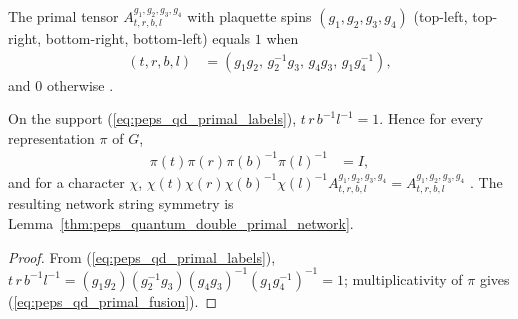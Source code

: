 





\begin{definition}%
    \label{def:peps_quantum_double_primal}
    \leanok
    The primal tensor $A^{g_1,g_2,g_3,g_4}_{t,r,b,l}$ with plaquette spins $(g_1,g_2,g_3,g_4)$ (top-left, top-right, bottom-right, bottom-left) equals $1$ when
    \begin{align}
        (t,r,b,l) & =(g_1g_2,\,g_2^{-1}g_3,\,g_4g_3,\,g_1g_4^{-1}),
        \label{eq:peps_qd_primal_labels}
    \end{align}
    and $0$ otherwise \cite[Appendix~A, ``The Toric Code and quantum double models'']{Cirac2021Matrix}.
\end{definition}

\begin{lemma}%
    \label{thm:peps_quantum_double_primal_fusion}
    \leanok
    On the support (\ref{eq:peps_qd_primal_labels}), $t\,r\,b^{-1}l^{-1}=1$. Hence for every representation $\pi$ of $G$,
    \begin{align}
        \pi(t)\pi(r)\pi(b)^{-1}\pi(l)^{-1} & =I,
        \label{eq:peps_qd_primal_fusion}
    \end{align}
    and for a character $\chi$, $\chi(t)\chi(r)\chi(b)^{-1}\chi(l)^{-1}A^{g_1,g_2,g_3,g_4}_{t,r,b,l}=A^{g_1,g_2,g_3,g_4}_{t,r,b,l}$ \cite[Appendix~A, ``The Toric Code and quantum double models'']{Cirac2021Matrix}. The resulting network string symmetry is Lemma~\ref{thm:peps_quantum_double_primal_network}.
\end{lemma}

\begin{proof}\leanok
    From (\ref{eq:peps_qd_primal_labels}), $t\,r\,b^{-1}l^{-1}=(g_1g_2)(g_2^{-1}g_3)(g_4g_3)^{-1}(g_1g_4^{-1})^{-1}=1$; multiplicativity of $\pi$ gives (\ref{eq:peps_qd_primal_fusion}).
\end{proof}

